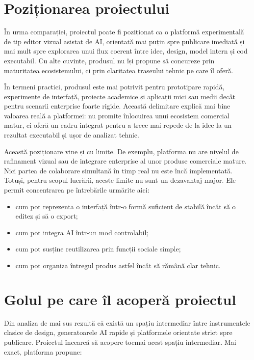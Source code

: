 \section{Poziționarea proiectului}

În urma comparației, proiectul poate fi poziționat ca o platformă experimentală de tip editor vizual asistat de AI, orientată mai puțin spre publicare imediată și mai mult spre explorarea unui flux coerent între idee, design, model intern și cod executabil. Cu alte cuvinte, produsul nu își propune să concureze prin maturitatea ecosistemului, ci prin claritatea traseului tehnic pe care îl oferă.

În termeni practici, produsul este mai potrivit pentru prototipare rapidă, experimente de interfață, proiecte academice și aplicații mici sau medii decât pentru scenarii enterprise foarte rigide. Această delimitare explică mai bine valoarea reală a platformei: nu promite înlocuirea unui ecosistem comercial matur, ci oferă un cadru integrat pentru a trece mai repede de la idee la un rezultat executabil și ușor de analizat tehnic.

Această poziționare vine și cu limite. De exemplu, platforma nu are nivelul de rafinament vizual sau de integrare enterprise al unor produse comerciale mature. Nici partea de colaborare simultană în timp real nu este încă implementată. Totuși, pentru scopul lucrării, aceste limite nu sunt un dezavantaj major. Ele permit concentrarea pe întrebările urmărite aici:

\begin{itemize}[leftmargin=1.5cm]
  \item cum pot reprezenta o interfață într-o formă suficient de stabilă încât să o editez și să o export;
  \item cum pot integra AI într-un mod controlabil;
  \item cum pot susține reutilizarea prin funcții sociale simple;
  \item cum pot organiza întregul produs astfel încât să rămână clar tehnic.
\end{itemize}

\section{Golul pe care îl acoperă proiectul}

Din analiza de mai sus rezultă că există un spațiu intermediar între instrumentele clasice de design, generatoarele AI rapide și platformele orientate strict spre publicare. Proiectul încearcă să acopere tocmai acest spațiu intermediar. Mai exact, platforma propune:

